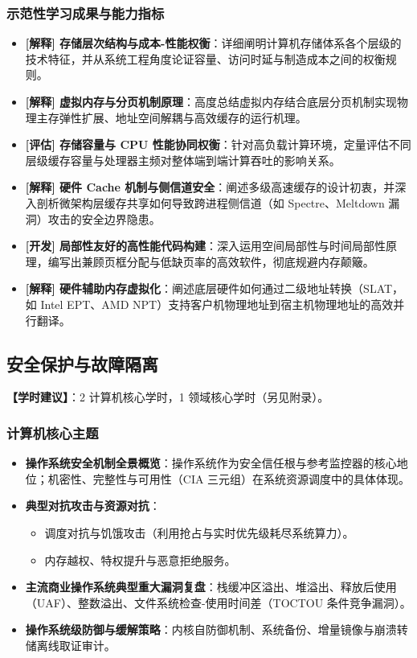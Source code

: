 \subsubsection{示范性学习成果与能力指标}
\begin{itemize}\setlength{\itemsep}{0pt}\setlength{\parskip}{0pt}
    \item \textbf{[解释] 存储层次结构与成本-性能权衡}：详细阐明计算机存储体系各个层级的技术特征，并从系统工程角度论证容量、访问时延与制造成本之间的权衡规则。
    \item \textbf{[解释] 虚拟内存与分页机制原理}：高度总结虚拟内存结合底层分页机制实现物理主存弹性扩展、地址空间解耦与高效缓存的运行机理。
    \item \textbf{[评估] 存储容量与 CPU 性能协同权衡}：针对高负载计算环境，定量评估不同层级缓存容量与处理器主频对整体端到端计算吞吐的影响关系。
    \item \textbf{[解释] 硬件 Cache 机制与侧信道安全}：阐述多级高速缓存的设计初衷，并深入剖析微架构层缓存共享如何导致跨进程侧信道（如 Spectre、Meltdown 漏洞）攻击的安全边界隐患。
    \item \textbf{[开发] 局部性友好的高性能代码构建}：深入运用空间局部性与时间局部性原理，编写出兼顾页框分配与低缺页率的高效软件，彻底规避内存颠簸。
    \item \textbf{[解释] 硬件辅助内存虚拟化}：阐述底层硬件如何通过二级地址转换（SLAT，如 Intel EPT、AMD NPT）支持客户机物理地址到宿主机物理地址的高效并行翻译。
\end{itemize}

\subsection{安全保护与故障隔离}
\textbf{【学时建议】}：2 计算机核心学时，1 领域核心学时（另见附录）。

\subsubsection{计算机核心主题}
\begin{itemize}\setlength{\itemsep}{0pt}\setlength{\parskip}{0pt}
    \item \textbf{操作系统安全机制全景概览}：操作系统作为安全信任根与参考监控器的核心地位；机密性、完整性与可用性（CIA 三元组）在系统资源调度中的具体体现。
    \item \textbf{典型对抗攻击与资源对抗}：
    \begin{itemize}\setlength{\itemsep}{0pt}\setlength{\parskip}{0pt}
        \item 调度对抗与饥饿攻击（利用抢占与实时优先级耗尽系统算力）。
        \item 内存越权、特权提升与恶意拒绝服务。
    \end{itemize}
    \item \textbf{主流商业操作系统典型重大漏洞复盘}：栈缓冲区溢出、堆溢出、释放后使用（UAF）、整数溢出、文件系统检查-使用时间差（TOCTOU 条件竞争漏洞）。
    \item \textbf{操作系统级防御与缓解策略}：内核自防御机制、系统备份、增量镜像与崩溃转储离线取证审计。
\end{itemize}

